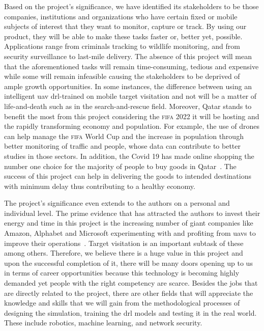 \documentclass[../main.tex]{subfiles}
\begin{document}
Based on the project's significance, we have identified 
its stakeholders to be 
those companies, institutions and organizations who
have certain fixed or mobile subjects of interest 
that they want to monitor, capture or track.
By using our product,
they will be able to make these tasks faster or,
better yet, possible.
Applications range from criminals tracking 
to wildlife monitoring,
and from security surveillance
to last-mile delivery.
The absence of this project will mean that
the aforementioned tasks will remain
time-consuming, tedious and expensive
while some will remain infeasible
causing the stakeholders to be deprived of ample growth opportunities.
In some instances, the difference between using 
an intelligent \gls{uav} \gls{drl}-trained on mobile target visitation
and not
will be a matter of life-and-death
such as in the search-and-rescue field.
Moreover, Qatar stands to benefit the most from this project 
considering the \textsc{fifa} 2022 it will be hosting
and the rapidly transforming economy and population.
For example, the use of drones can help manage 
the \textsc{fifa} World Cup 
and the increase in population through better monitoring 
of traffic and people, whose data can contribute
to better studies in those sectors.
In addition, the Covid 19 has made online shopping
the number one choice for 
the majority of people to buy goods in Qatar~\cite{Has20}.
The success of this project can help in delivering
the goods to intended destinations with minimum delay
thus contributing to a healthy economy.

The project's significance even extends to the authors
on a personal and individual level.
The prime evidence that has attracted the authors to invest
their energy and time in this project is
the increasing number of giant companies like Amazon, Alphabet
and Microsoft experimenting with and profiting from \glspl{uav}
to improve their operations~\cite{Jun17}.
Target visitation is an important subtask of these among others.
Therefore, we believe there is a huge value
in this project and upon the successful completion of it,
there will be many doors opening up to us in terms of
career opportunities because 
this technology is becoming highly demanded yet 
people with the right competency
are scarce.
Besides the jobs that are directly related to the project,
there are other fields that will appreciate the knowledge
and skills that we will gain from the methodological processes 
of designing the simulation,
training the \gls{drl} models and testing it in the real world.
These include robotics, machine learning, and 
network security.
\end{document}
